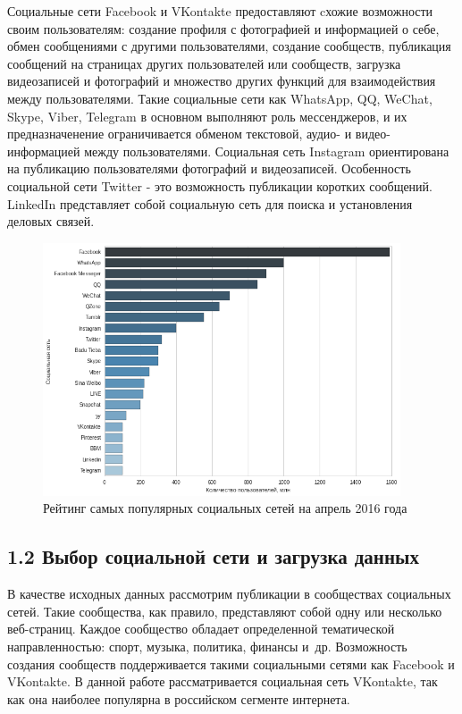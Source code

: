 \documentclass[a4paper]{report}
\begin{document}
	Социальные сети Facebook и VKontakte предоставляют cхожие возможности своим пользователям: создание профиля с фотографией и информацией о себе, обмен сообщениями с другими пользователями, создание сообществ, публикация сообщений на страницах других пользователей или сообществ, загрузка видеозаписей и фотографий и множество других функций для взаимодействия между пользователями. 
	Такие социальные сети как WhatsApp, QQ, WeChat, Skype, Viber, Telegram в основном выполняют роль мессенджеров, и их предназначенение ограничивается обменом текстовой, аудио- и видео- информацией между пользователями. 
	Социальная сеть Instagram ориентирована на публикацию пользователями фотографий и видеозаписей.
	Особенность социальной сети Twitter - это возможность публикации коротких сообщений. LinkedIn представляет собой социальную сеть для поиска и установления деловых связей.
	
	
	
	
	


	
	\begin{figure}
		\centering
		\includegraphics[width=400px]
		{imgs/NetworkStatistics.png}
		\caption{Рейтинг самых популярных  социальных сетей на апрель 2016 года}
		\label{fig:stat}
	\end{figure}
	
	
	
	
	
	\subsection{1.2 Выбор социальной сети и загрузка данных}
	
	В качестве исходных данных рассмотрим публикации в сообществах социальных сетей. 
	Такие сообщества, как правило, представляют собой одну или несколько веб-страниц. 
	Каждое сообщество обладает определенной тематической направленностью: спорт, музыка, политика, финансы и~др.
	Возможность создания сообществ поддерживается такими социальными сетями как Facebook и VKontakte. 
	В данной работе рассматривается социальная сеть VKontakte, так как она наиболее популярна в российском сегменте интернета.
			
\end{document}
